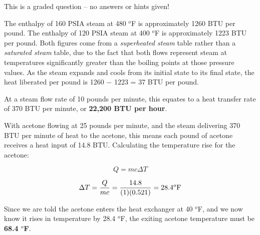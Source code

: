 This is a graded question -- no answers or hints given!







The enthalpy of 160 PSIA steam at 480 $^{o}$F is approximately 1260 BTU per pound.  The enthalpy of 120 PSIA steam at 400 $^{o}$F is approximately 1223 BTU per pound.  Both figures come from a {\it superheated steam} table rather than a {\it saturated steam} table, due to the fact that both flows represent steam at temperatures significantly greater than the boiling points at those pressure values.  As the steam expands and cools from its initial state to its final state, the heat liberated per pound is 1260 $-$ 1223 = 37 BTU per pound.

\vskip 10pt

At a steam flow rate of 10 pounds per minute, this equates to a heat transfer rate of 370 BTU per minute, or {\bf 22,200 BTU per hour}.

\vskip 10pt

With acetone flowing at 25 pounds per minute, and the steam delivering 370 BTU per minute of heat to the acetone, this means each pound of acetone receives a heat input of 14.8 BTU.  Calculating the temperature rise for the acetone:

$$Q = mc \Delta T$$

$$\Delta T = {Q \over mc} = {14.8 \over (1)(0.521)} = 28.4^o \hbox{F}$$

Since we are told the acetone enters the heat exchanger at 40 $^{o}$F, and we now know it rises in temperature by 28.4 $^{o}$F, the exiting acetone temperature must be {\bf 68.4 $^{o}$F}.




